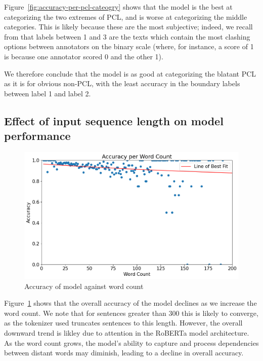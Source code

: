 \documentclass[11pt,a4paper]{article}
\begin{document}
Figure~\ref{fig:accuracy-per-pcl-cateogry} shows that the model is the best at categorizing the two extremes of PCL, and is worse at categorizing the middle categories. This is likely because these are the most subjective; indeed, we recall from \citet{perez-almendros-etal-2020-dont} that labels between 1 and 3 are the texts which contain the most clashing options between annotators on the binary scale (where, for instance, a score of 1 is because one annotator scored 0 and the other 1).

We therefore conclude that the model is as good at categorizing the blatant PCL as it is for obvious non-PCL, with the least accuracy in the boundary labels between label 1 and label 2.

\subsection*{Effect of input sequence length on model performance}

\begin{figure}[H]
    \centering
    \includegraphics[width=\linewidth]{figures/accuracy_due_to_word_length.png}
    \caption{Accuracy of model against word count}
    \label{fig:accuracy-word-count}
\end{figure}

Figure~\ref{fig:accuracy-word-count} shows that the overall accuracy of the model declines as we increase the word count. We note that for sentences greater than $300$ this is likely to converge, as the tokenizer used truncates sentences to this length. However, the overall downward trend is likley due to attention in the RoBERTa model architecture. As the word count grows, the model's ability to capture and process dependencies between distant words may diminish, leading to a decline in overall accuracy.
\end{document}

